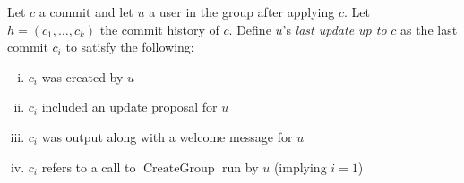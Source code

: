 \begin{definition} \label{def:last-update-before-commit}
	Let $c$ a commit and let $u$ a user in the group after applying $c$. Let $h = (c_1, \ldots, c_k)$ the commit history of $c$. Define $u$'s \emph{last update up to} $c$ as the last commit $c_i$ to satisfy the following:
	\begin{enumerate}[(i)]
		\item $c_i$ was created by $u$
		\item $c_i$ included an update proposal for $u$
		\item $c_i$ was output along with a welcome message for $u$
		\item $c_i$ refers to a call to $\operatorname{CreateGroup}$ run by $u$ (implying $i = 1$)
	\end{enumerate}
\end{definition}

